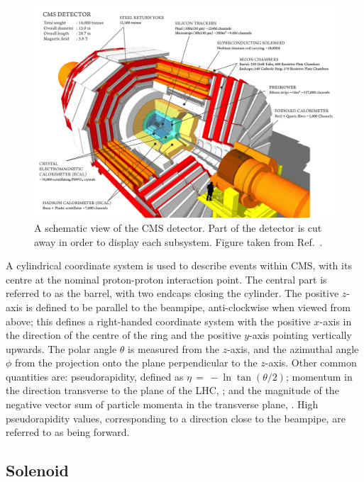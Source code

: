 \begin{figure}[h!]
  \centering
  \includegraphics[width=\textwidth]{Figures/Detector/CMSschematic.png}
  \caption[A schematic view of the CMS detector.]
  {
    A schematic view of the CMS detector.
    Part of the detector is cut away in order to display each subsystem.
    Figure taken from Ref.~\cite{SketchUp}.
  }
  \label{fig:detector_CMSschematic}
\end{figure}

A cylindrical coordinate system is used to describe events within CMS, with its centre at the nominal proton-proton interaction point.
The central part is referred to as the barrel, with two endcaps closing the cylinder.
The positive $z$-axis is defined to be parallel to the beampipe, anti-clockwise when viewed from above; 
this defines a right-handed coordinate system with the positive $x$-axis in the direction of the centre of the ring and the positive $y$-axis pointing vertically upwards.
The polar angle $\theta$ is measured from the $z$-axis, and the azimuthal angle $\phi$ from the projection onto the plane perpendicular to the $z$-axis.
Other common quantities are: pseudorapidity, defined as $\eta \, = \, -\ln{\tan{(\theta/2)}}$; 
momentum in the direction transverse to the plane of the LHC, \pt; 
and the magnitude of the negative vector sum of particle momenta in the transverse plane, \met.
High pseudorapidity values, corresponding to a direction close to the beampipe, are referred to as being forward.

\subsection{Solenoid}

